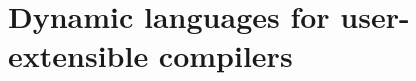 







\section{Dynamic languages for user-extensible compilers}
\label{sec:dynamism-pattern-rewriting-motivating}

